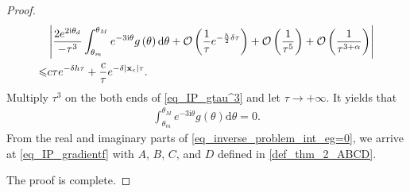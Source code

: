 \documentclass[10pt,a4paper]{amsart}
\begin{document}
\begin{proof}
	\begin{align} \label{eq_IP_gtau^3}
		& \left|\frac{2e^{2\text{i}\theta_d}}{-\tau^3}  \int_{\theta_m}^{\theta_M} e^{-3\text{i}\theta} g\left(\theta\right) \mathrm{d}\theta + \mathcal{O} \left( \frac{1}{\tau} e^{-\frac{h}{2}\delta\tau} \right) + \mathcal{O} \left(\frac{1}{\tau^5}\right) + \mathcal{O} \left(\frac{1}{\tau^{3+\alpha}}\right)\right| \notag \\
		\leqslant & c\tau e^{- \delta h \tau} + \frac{c}{\tau}e^{-\delta\left|\mathbf{x}_{\varepsilon}\right|\tau} .
	\end{align}
	Multiply $ \tau^3 $ on the both ends of \eqref{eq_IP_gtau^3} and let $ \tau \to +\infty $. It yields that
	\begin{align} \label{eq_inverse_problem_int_eg=0}
		\int_{\theta_m}^{\theta_M} e^{-3\text{i}\theta} g\left(\theta\right) \mathrm{d}\theta = 0 . 
	\end{align}
	From the real and imaginary parts of \eqref{eq_inverse_problem_int_eg=0}, we arrive at \eqref{eq_IP_gradientf} with $ A $, $ B $, $ C $, and $ D $ defined in \eqref{def_thm_2_ABCD}.
	
	The proof is complete.
\end{proof}
\end{document}

